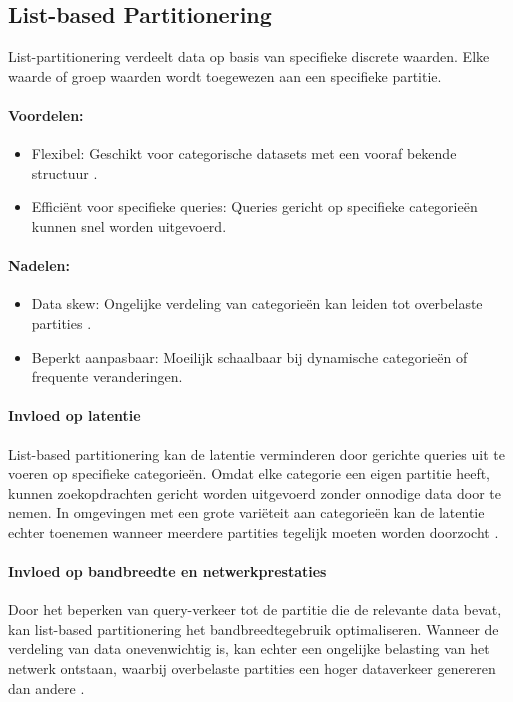 \subsection{List-based Partitionering}
List-partitionering verdeelt data op basis van specifieke discrete waarden. Elke waarde of groep waarden wordt toegewezen aan een specifieke partitie.
 
\paragraph{Voordelen:}
\begin{itemize}
    \item Flexibel: Geschikt voor categorische datasets met een vooraf bekende structuur \autocite{Mahmud2020}.
    \item Efficiënt voor specifieke queries: Queries gericht op specifieke categorieën kunnen snel worden uitgevoerd.
\end{itemize}
 
\paragraph{Nadelen:}
\begin{itemize}
    \item Data skew: Ongelijke verdeling van categorieën kan leiden tot overbelaste partities \autocite{Mahmud2020}.
    \item Beperkt aanpasbaar: Moeilijk schaalbaar bij dynamische categorieën of frequente veranderingen.
\end{itemize}
 
\paragraph{Invloed op latentie} 
List-based partitionering kan de latentie verminderen door gerichte queries uit te voeren op specifieke categorieën. Omdat elke categorie een eigen partitie heeft, kunnen zoekopdrachten gericht worden uitgevoerd zonder onnodige data door te nemen. In omgevingen met een grote variëteit aan categorieën kan de latentie echter toenemen wanneer meerdere partities tegelijk moeten worden doorzocht \autocite{Ponnusamy2024, Mahmud2020}.
 
\paragraph{Invloed op bandbreedte en netwerkprestaties} 
Door het beperken van query-verkeer tot de partitie die de relevante data bevat, kan list-based partitionering het bandbreedtegebruik optimaliseren. Wanneer de verdeling van data onevenwichtig is, kan echter een ongelijke belasting van het netwerk ontstaan, waarbij overbelaste partities een hoger dataverkeer genereren dan andere \autocite{Mahmud2020}.
 
